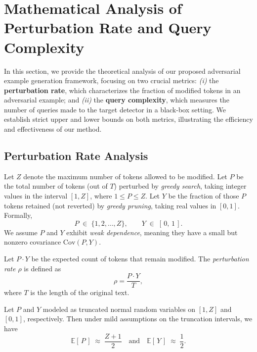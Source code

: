 \section{Mathematical Analysis of Perturbation Rate and Query Complexity}
\label{sec:analysis}

In this section, we provide the theoretical analysis of our proposed adversarial example generation framework, focusing on two crucial metrics: \textit{(i)} the \textbf{perturbation rate}, which characterizes the fraction of modified tokens in an adversarial example; and \textit{(ii)} the \textbf{query complexity}, which measures the number of queries made to the target detector in a black-box setting. We establish strict upper and lower bounds on both metrics, illustrating the efficiency and effectiveness of our method.

\subsection{Perturbation Rate Analysis}

\noindent
\begin{definition}
\label{def:randomvars}
Let \( Z \) denote the maximum number of tokens allowed to be modified. Let \(P\) be the total number of tokens (out of \(T\)) perturbed by \emph{greedy search}, taking integer values in the interval \([1, Z]\), where \(1 \le P \le Z\). Let \(Y\) be the fraction of those \(P\) tokens retained (not reverted) by \emph{greedy pruning}, taking real values in \([0, 1]\). Formally, 
\[
  P \;\in\;\{1,2,\dots,Z\},
  \qquad
  Y \;\in\;[\,0,\,1\,].
\]
We assume \(P\) and \(Y\) exhibit \emph{weak dependence}, meaning they have a small but nonzero covariance \(\mathrm{Cov}(P, Y)\).
\end{definition}

\begin{definition}
\label{def:perturbation_rate}
Let \(P \cdot Y\) be the expected count of tokens that remain modified. The \emph{perturbation rate $\rho$} is defined as
\[
  \rho = \frac{P \cdot Y}{T},
\]
where \(T\) is the length of the original text.
\end{definition}

\begin{theorem}
\label{thm:bounds1}
Let \(P\) and \(Y\) modeled as truncated normal random variables on \([1,Z]\) and \([0,1]\), respectively. Then under mild assumptions on the truncation intervals, we have
\[
  \mathbb{E}[\,P\,] \;\approx\; \frac{Z+1}{2}
  \quad\text{and}\quad
  \mathbb{E}[\,Y\,] \;\approx\; \frac{1}{2}.
\]
\end{theorem}

